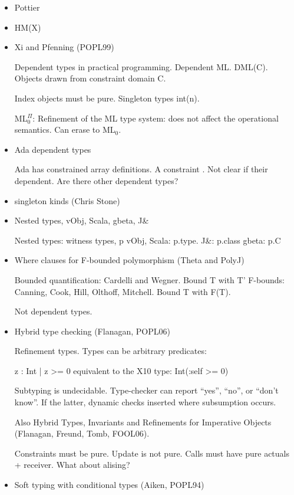 \begin{itemize}
\item Pottier
\item HM(X)
\item Xi and Pfenning (POPL99)

Dependent types in practical programming.
Dependent ML.  DML(C). Objects drawn from constraint domain C.

Index objects must be pure.
Singleton types int(n).

ML$^{\Pi}_0$:
Refinement of the ML type system: does not affect the
operational semantics.  Can erase to ML$_0$.



\item Ada dependent types

Ada has constrained array definitions.  A constraint
\cite{ada-ref-man}.  Not clear if their dependent.  Are there other dependent
types?

\item singleton kinds (Chris Stone)

\item Nested types, vObj, Scala, gbeta, J\&

Nested types: witness types, p
vObj, Scala: p.type.
J\&: p.class
gbeta: p.C

\item Where clauses for F-bounded polymorphism (Theta and PolyJ)

Bounded quantification: Cardelli and Wegner.  Bound T with T'
F-bounds: Canning, Cook, Hill, Olthoff, Mitchell.  Bound T with F(T).

Not dependent types.

\item Hybrid type checking (Flanagan, POPL06)


Refinement types.  Types can be arbitrary predicates:

        { z : Int | z >= 0 }
        equivalent to the X10 type:
        Int(:self >= 0)

Subtyping is undecidable.  Type-checker can report ``yes'',
``no'',
or ``don't know''.  If the latter, dynamic checks inserted where
subsumption occurs.

Also Hybrid Types, Invariants and Refinements for Imperative
Objects (Flanagan, Freund, Tomb, FOOL06).

    Constraints must be pure.  Update is not pure.
    Calls must have pure actuals + receiver.
    What about alising?


\item Soft typing with conditional types (Aiken, POPL94)


\end{itemize}
